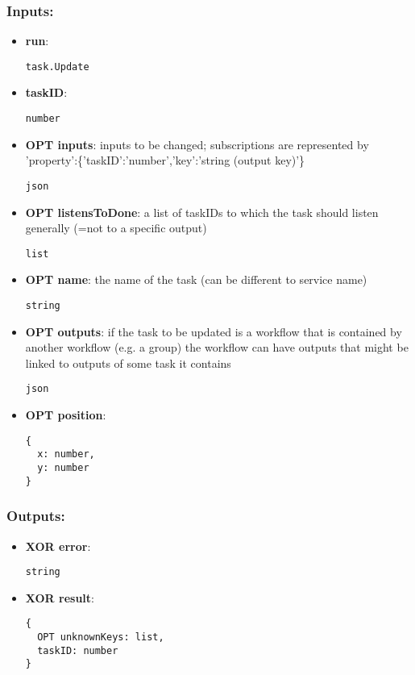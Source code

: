 \subsubsection*{Inputs:}
\begin{itemize}
  \small
    \item \textbf{run}: 
\begin{lstlisting}
task.Update
\end{lstlisting}
    \item \textbf{taskID}: 
\begin{lstlisting}
number
\end{lstlisting}
    \item \textbf{OPT inputs}: inputs to be changed; subscriptions are represented by 'property':\{'taskID':'number','key':'string (output key)'\}
\begin{lstlisting}
json
\end{lstlisting}
    \item \textbf{OPT listensToDone}: a list of taskIDs to which the task should listen generally (=not to a specific output)
\begin{lstlisting}
list
\end{lstlisting}
    \item \textbf{OPT name}: the name of the task (can be different to service name)
\begin{lstlisting}
string
\end{lstlisting}
    \item \textbf{OPT outputs}: if the task to be updated is a workflow that is contained by another  workflow (e.g. a group) the workflow can have outputs that might be  linked to outputs of some task it contains
\begin{lstlisting}
json
\end{lstlisting}
    \item \textbf{OPT position}: 
\begin{lstlisting}
{
  x: number, 
  y: number
}
\end{lstlisting}
  \end{itemize}
\subsubsection*{Outputs:}
\begin{itemize}
  \small
    \item \textbf{XOR error}: 
\begin{lstlisting}
string
\end{lstlisting}
    \item \textbf{XOR result}: 
\begin{lstlisting}
{
  OPT unknownKeys: list, 
  taskID: number
}
\end{lstlisting}
  \end{itemize}

